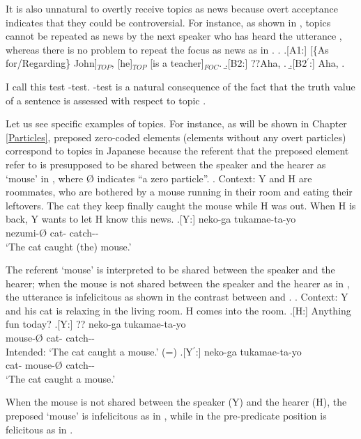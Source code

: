It is also unnatural to overtly receive topics as news
because overt acceptance indicates that they could be controversial.
For instance, as shown in \Next[B2],
topics cannot be repeated as news by the next speaker who has heard the utterance \Next[A1],
whereas there is no problem to repeat the focus as news as in \Next[B2$^{\prime}$].
%
\ex.\label{aha} \a.[A1:] [\{As for/Regarding\} John]$_{TOP}$, [he]$_{TOP}$ [is a teacher]$_{FOC}$.
     \b.[B2:] ??Aha, .
     \b.[B2$^{\prime}$:] Aha, .

I call this test -test.
-test is a natural consequence of the fact that
the truth value of a sentence is assessed with respect to topic \cite{strawson64}.

Let us see specific examples of topics.
For instance,
as will be shown in Chapter \ref{Particles},
preposed zero-coded elements (elements without any overt particles) correspond to topics in Japanese
because the referent that the preposed element refer to is presupposed to be shared between the speaker and the hearer as  `mouse' in \Next,
where {\O} indicates ``a zero particle''.
	\ex. \label{FrameworkExMouse}Context: Y and H are roommates,
		who are bothered by a mouse running in their room
		and eating their leftovers.
		The cat they keep finally caught the mouse while H was out.
		When H is back, Y wants to let H know this news.
		\ag.[Y:]  neko-ga tukamae-ta-yo \\
			nezumi-{\O} cat- catch-- \\
			`The cat caught (the) mouse.'
	
The referent `mouse' is interpreted to be shared between the speaker and the hearer;
when the mouse is not shared between the speaker and the hearer as in \Next,
the utterance is infelicitous as shown in the contrast between \Next[Y] and \Next[Y$^{\prime}$].
	\ex. \label{TopDef}Context: Y and his cat is relaxing in the living room.
		H comes into the room.
		\a.[H:] Anything fun today?
		\bg.[Y:] ?? neko-ga tukamae-ta-yo \\
			mouse-{\O} cat- catch-- \\
			Intended: `The cat caught a mouse.' \hfill{(=\LLast[Y])}
		\bg.[Y$^{\prime}$:] neko-ga  tukamae-ta-yo \\
			cat- mouse-{\O} catch-- \\
			`The cat caught a mouse.'

When the mouse is not shared between the speaker (Y) and the hearer (H),
the preposed  `mouse' is infelicitous as in \Last[Y],
while  in the pre-predicate position is felicitous as in \Last[Y$^{\prime}$].


